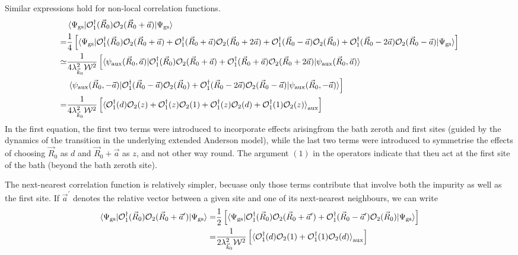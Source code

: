 \documentclass{report}
\numberwithin{equation}{section}
\begin{document}
Similar expressions hold for non-local correlation functions.
\begin{equation}\begin{aligned}
	\label{nonlocal_correlation}
	&\braket{\Psi_\text{gs} | \mathcal{O}_1^\dagger(\vec R_0) \mathcal{O}_2(\vec R_0 + \vec a) | \Psi_\text{gs}} \\
	=& \frac{1}{4}\left[\braket{\Psi_\text{gs} | \mathcal{O}_1^\dagger(\vec R_0) \mathcal{O}_2(\vec R_0 + \vec a) + \mathcal{O}_1^\dagger(\vec R_0 + \vec a) \mathcal{O}_2(\vec R_0 + 2\vec a) + \mathcal{O}_1^\dagger(\vec R_0 - \vec a) \mathcal{O}_2(\vec R_0) + \mathcal{O}_1^\dagger(\vec R_0 - 2\vec a) \mathcal{O}_2(\vec R_0 - \vec a) | \Psi_\text{gs}}\right]\\
	\simeq& \frac{1}{4\lambda_{\vec k_0}^2 \mathcal{W}^2}\left[\braket{\psi_\text{aux}(\vec R_0, \vec a) | \mathcal{O}_1^\dagger(\vec R_0) \mathcal{O}_2(\vec R_0 + \vec a) + \mathcal{O}_1^\dagger(\vec R_0 + \vec a) \mathcal{O}_2(\vec R_0 + 2\vec a) | \psi_\text{aux}(\vec R_0, \vec a)} \right. \\
	      &\left.\braket{\psi_\text{aux}(\vec R_0, -\vec a) | \mathcal{O}_1^\dagger(\vec R_0 - \vec a) \mathcal{O}_2(\vec R_0) + \mathcal{O}_1^\dagger(\vec R_0 - 2\vec a) \mathcal{O}_2(\vec R_0 - \vec a) | \psi_\text{aux}(\vec R_0, -\vec a)}\right]\\
	=& \frac{1}{4\lambda_{\vec k_0}^2 \mathcal{W}^2}\left[\braket{\mathcal{O}_1^\dagger(d) \mathcal{O}_2(z) + \mathcal{O}_1^\dagger(z) \mathcal{O}_2(1) + \mathcal{O}_1^\dagger(z) \mathcal{O}_2(d) + \mathcal{O}_1^\dagger(1) \mathcal{O}_2(z)}_\text{aux}\right]
\end{aligned}\end{equation}
In the first equation, the first two terms were introduced to incorporate effects arisingfrom the bath zeroth and first sites (guided by the dynamics of the transition in the underlying extended Anderson model), while the last two terms were introduced to symmetrise the effects of choosing \(\vec R_0\) as \(d\) and \(\vec R_0 + \vec a\) as \(z\), and not other way round. The argument \((1)\) in the operators indicate that theu act at the first site of the bath (beyond the bath zeroth site).

The next-nearest correlation function is relatively simpler, becuase only those terms contribute that involve both the impurity as well as the first site. If \(\vec a^\prime\) denotes the relative vector between a given site and one of its next-nearest neighbours, we can write
\begin{equation}\begin{aligned}
	\label{nnn_correlation}
	\braket{\Psi_\text{gs} | \mathcal{O}_1^\dagger(\vec R_0) \mathcal{O}_2(\vec R_0 + \vec a^\prime) | \Psi_\text{gs}} =& \frac{1}{2}\left[\braket{\Psi_\text{gs} | \mathcal{O}_1^\dagger(\vec R_0) \mathcal{O}_2(\vec R_0 + \vec a^\prime) + \mathcal{O}_1^\dagger(\vec R_0 - \vec a^\prime) \mathcal{O}_2(\vec R_0) | \Psi_\text{gs}}\right]\\
	=& \frac{1}{2\lambda_{\vec k_0}^2 \mathcal{W}^2}\left[\braket{\mathcal{O}_1^\dagger(d) \mathcal{O}_2(1) + \mathcal{O}_1^\dagger(1) \mathcal{O}_2(d)}_\text{aux}\right]
\end{aligned}\end{equation}
\end{document}
